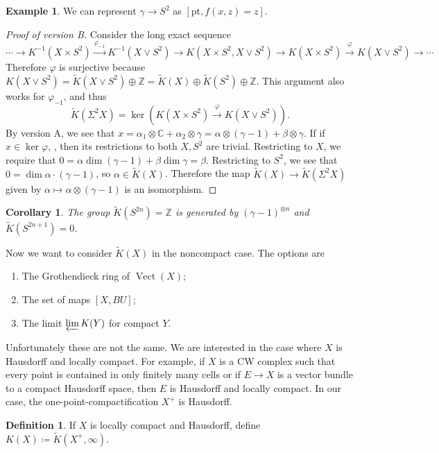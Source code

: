 \documentclass[leqno, openany]{memoir}
\newtheorem{cor}[thm]{Corollary}
\theoremstyle{definition}
\newtheorem{defn}[thm]{Definition}
\newtheorem{exm}[thm]{Example}
\theoremstyle{remark}
\theoremstyle{plain}
\theoremstyle{definition}
\theoremstyle{remark}
\newcommand{\C}{\mathbb{C}}
\newcommand{\Z}{\mathbb{Z}}
\newcommand{\mr}[1]{\mathrm{#1}}
\newcommand{\wt}[1]{\widetilde{#1}}
\DeclareMathOperator{\Vect}{Vect}
\begin{document}
\begin{exm}
    We can represent $\gamma \to S^2$ as $[\mr{pt}, f(x,z) = z]$.
\end{exm}

\begin{proof}[Proof of version B]
    Consider the long exact sequence
    \[ \cdots \to K^{-1}(X \times S^2) \xrightarrow{\varphi_{-1}} K^{-1}(X \vee S^2) \to K(X \times S^2, X \vee S^2) \to K(X \times S^2) \xrightarrow{\varphi} K(X \vee S^2) \to \cdots \]
    Therefore $\varphi$ is surjective because $K(X \vee S^2) = \wt{K}(X \vee S^2) \oplus \Z = \wt{K}(X) \oplus \wt{K}(S^2) \oplus \Z$. This argument also works for $\varphi_{-1}$, and thus
    \[ \wt{K}(\Sigma^2 X) = \ker (K(X \times S^2) \xrightarrow{\varphi} K(X \vee S^2)). \]
    By version A, we see that $x = \alpha_1 \otimes \C + \alpha_2 \otimes \gamma = \alpha \otimes (\gamma-1) + \beta \otimes \gamma$. If if $x \in \ker \varphi$, , then its restrictions to both $X, S^2$ are trivial. Restricting to $X$, we require that $0 = \alpha \dim(\gamma-1) + \beta \dim \gamma = \beta$. Restricting to $S^2$, we see that $0 = \dim \alpha \cdot (\gamma-1)$, so $\alpha \in \wt{K}(X)$. Therefore the map $\wt{K}(X) \to \wt{K}(\Sigma^2 X)$ given by $\alpha \mapsto \alpha \otimes (\gamma-1)$ is an isomorphism.
\end{proof}

\begin{cor}
    The group $\wt{K}(S^{2n}) = \Z$ is generated by ${(\gamma-1)}^{\otimes n}$ and $\wt{K}(S^{2n+1}) = 0$.
\end{cor}

Now we want to consider $\wt{K}(X)$ in the noncompact case. The options are
\begin{enumerate}
    \item The Grothendieck ring of $\Vect(X)$;
    \item The set of maps $[X, BU]$;
    \item The limit $\varprojlim K(Y)$ for compact $Y$.
\end{enumerate}

Unfortunately these are not the same. We are interested in the case where $X$ is Hausdorff and locally compact. For example, if $X$ is a CW complex such that every point is contained in only finitely many cells or if $E \to X$ is a vector bundle to a compact Hausdorff space, then $E$ is Hausdorff and locally compact. In our case, the one-point-compactification $X^+$ is Hausdorff.

\begin{defn}
    If $X$ is locally compact and Hausdorff, define $K(X) \coloneqq \wt{K}(X^+, \infty)$.
\end{defn}
\end{document}
